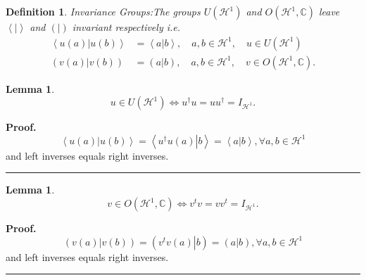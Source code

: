 \documentclass[aps,preprint]{revtex4}%
\newtheorem{definition}[theorem]{Definition}
\newtheorem{lemma}[theorem]{Lemma}
\newenvironment{proof}[1][Proof]{\noindent\textbf{#1.} }{\ \rule{0.5em}{0.5em}}
\begin{document}
\begin{definition}
Invariance Groups:The groups $U\left(  \mathcal{H}^{1}\right)  $ and $O\left(
\mathcal{H}^{1},\mathbb{C}\right)  $ leave $\left\langle \left.  {}\right\vert
\right\rangle $ and $\left(  \left.  {}\right\vert \right)  $ invariant
respectively i.e.%
\begin{align}
\left\langle \left.  u\left(  a\right)  \right\vert u\left(  b\right)
\right\rangle  &  =\left\langle \left.  a\right\vert b\right\rangle ,\quad
a,b\in\mathcal{H}^{1},\quad u\in U\left(  \mathcal{H}^{1}\right) \\
\left(  \left.  v\left(  a\right)  \right\vert v\left(  b\right)  \right)   &
=\left(  \left.  a\right\vert b\right)  ,\quad a,b\in\mathcal{H}^{1},\quad
v\in O\left(  \mathcal{H}^{1},\mathbb{C}\right)  .
\end{align}

\end{definition}

\begin{lemma}%
\begin{equation}
u\in U\left(  \mathcal{H}^{1}\right)  \Longleftrightarrow u^{\dagger
}u=uu^{\dagger}=I_{\mathcal{H}^{1}}.
\end{equation}

\end{lemma}

\begin{proof}%
\begin{equation}
\left\langle \left.  u\left(  a\right)  \right\vert u\left(  b\right)
\right\rangle =\left\langle \left.  u^{\dagger}u\left(  a\right)  \right\vert
b\right\rangle =\left\langle \left.  a\right\vert b\right\rangle ,\forall
a,b\in\mathcal{H}^{1}%
\end{equation}
and left inverses equals right inverses.
\end{proof}

\begin{lemma}%
\begin{equation}
v\in O\left(  \mathcal{H}^{1},\mathbb{C}\right)  \Longleftrightarrow
v^{t}v=vv^{t}=I_{\mathcal{H}^{1}}.
\end{equation}

\end{lemma}

\begin{proof}%
\begin{equation}
\left(  \left.  v\left(  a\right)  \right\vert v\left(  b\right)  \right)
=\left(  \left.  v^{t}v\left(  a\right)  \right\vert b\right)  =\left(
\left.  a\right\vert b\right)  ,\forall a,b\in\mathcal{H}^{1}%
\end{equation}
and left inverses equals right inverses.
\end{proof}
\end{document}
